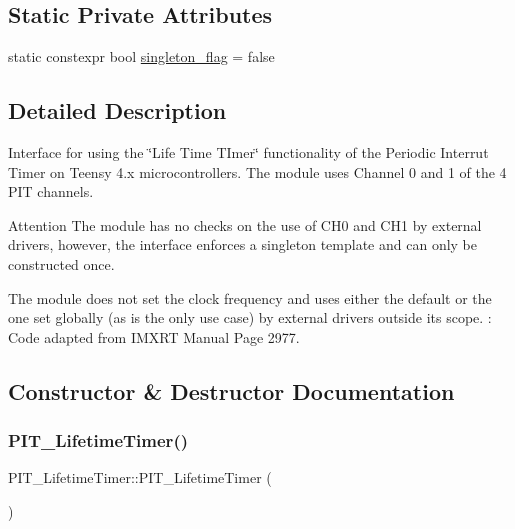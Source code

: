 \subsection*{Static Private Attributes}
\begin{DoxyCompactItemize}
\item 
static constexpr bool \hyperlink{classPIT__LifetimeTimer_ac864330dcb91ab7ef876f15ddd74f923}{singleton\+\_\+flag} = false
\end{DoxyCompactItemize}


\subsection{Detailed Description}
Interface for using the \char`\"{}\+Life Time T\+Imer\char`\"{} functionality of the Periodic Interrut Timer on Teensy 4.\+x microcontrollers. The module uses Channel 0 and 1 of the 4 P\+IT channels. 

\begin{DoxyAttention}{Attention}
The module has no checks on the use of C\+H0 and C\+H1 by external drivers, however, the interface enforces a singleton template and can only be constructed once. 

The module does not set the clock frequency and uses either the default or the one set globally (as is the only use case) by external drivers outside its scope.  \+: Code adapted from I\+M\+X\+RT Manual Page 2977. 
\end{DoxyAttention}


\subsection{Constructor \& Destructor Documentation}
\mbox{\label{classPIT__LifetimeTimer_a826797e75688ab4e7cd5c8854fa6a7c0}} 
\subsubsection{\texorpdfstring{P\+I\+T\+\_\+\+Lifetime\+Timer()}{PIT\_LifetimeTimer()}}
{\footnotesize\ttfamily P\+I\+T\+\_\+\+Lifetime\+Timer\+::\+P\+I\+T\+\_\+\+Lifetime\+Timer (\begin{DoxyParamCaption}{ }\end{DoxyParamCaption})\hspace{0.3cm}{\ttfamily [inline]}}



